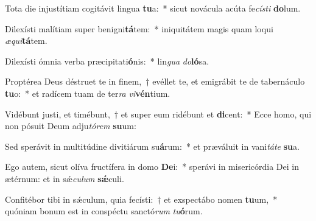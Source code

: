 \item Tota die injustítiam cogitávit lingua \textbf{tu}a:~* sicut novácula acúta fe\textit{cís}\textit{ti} \textbf{do}lum.
\item Dilexísti malítiam super benigni\textbf{tá}tem:~* iniquitátem magis quam loqui \textit{æ}\textit{qui}\textbf{tá}tem.
\item Dilexísti ómnia verba præcipitati\textbf{ó}nis:~* lin\textit{gua} \textit{do}\textbf{ló}sa.
\item Proptérea Deus déstruet te in finem,~† evéllet te, et emigrábit te de tabernáculo \textbf{tu}o:~* et radícem tuam de ter\textit{ra} \textit{vi}\textbf{vén}tium.
\item Vidébunt justi, et timébunt,~† et super eum ridébunt et \textbf{di}cent:~* Ecce homo, qui non pósuit Deum adju\textit{tó}\textit{rem} \textbf{su}um:
\item Sed sperávit in multitúdine divitiárum su\textbf{á}rum:~* et præváluit in vani\textit{tá}\textit{te} \textbf{su}a.
\item Ego autem, sicut olíva fructífera in domo \textbf{De}i:~* sperávi in misericórdia Dei in ætérnum: et in sǽ\textit{cu}\textit{lum} \textbf{sǽ}culi.
\item Confitébor tibi in sǽculum, quia fecísti:~† et exspectábo nomen \textbf{tu}um,~* quóniam bonum est in conspéctu sanctó\textit{rum} \textit{tu}\textbf{ó}rum.
